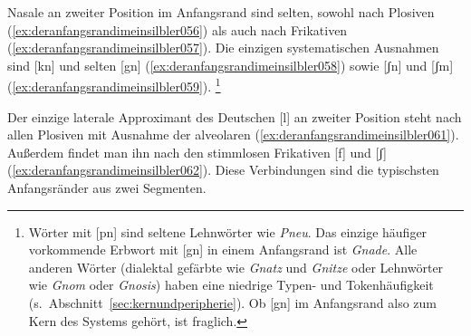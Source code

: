 \begin{exe}
  \ex\label{ex:deranfangsrandimeinsilbler051}
  \begin{xlist}
  \end{xlist}
\end{exe}

Nasale an zweiter Position im Anfangsrand sind selten, sowohl nach Plosiven (\ref{ex:deranfangsrandimeinsilbler056}) als auch nach Frikativen (\ref{ex:deranfangsrandimeinsilbler057}).
Die einzigen systematischen Ausnahmen sind [kn] und selten [gn] (\ref{ex:deranfangsrandimeinsilbler058}) sowie [ʃn] und [ʃm] (\ref{ex:deranfangsrandimeinsilbler059}).%
\footnote{Wörter mit [pn] sind seltene Lehnwörter wie \textit{Pneu}.
Das einzige häufiger vorkommende Erbwort mit [gn] in einem Anfangsrand ist \textit{Gnade}.
Alle anderen Wörter (\zB dialektal gefärbte wie \textit{Gnatz} und \textit{Gnitze} oder Lehnwörter wie \textit{Gnom} oder \textit{Gnosis}) haben eine niedrige Typen- und Tokenhäufigkeit (s.\ Abschnitt~\ref{sec:kernundperipherie}).
Ob [gn] im Anfangsrand also zum Kern des Systems gehört, ist fraglich.}

\Np

\begin{exe}
  \ex\label{ex:deranfangsrandimeinsilbler055}
  \begin{xlist}
  \end{xlist}
\end{exe}

Der einzige laterale Approximant des Deutschen [l] an zweiter Position steht nach allen Plosiven mit Ausnahme der alveolaren (\ref{ex:deranfangsrandimeinsilbler061}).
Außerdem findet man ihn nach den stimmlosen Frikativen [f] und [ʃ] (\ref{ex:deranfangsrandimeinsilbler062}).
Diese Verbindungen sind die typischsten Anfangsränder aus zwei Segmenten.

\begin{exe}
  \ex\label{ex:deranfangsrandimeinsilbler060}
  \begin{xlist}
  \end{xlist}
\end{exe}

